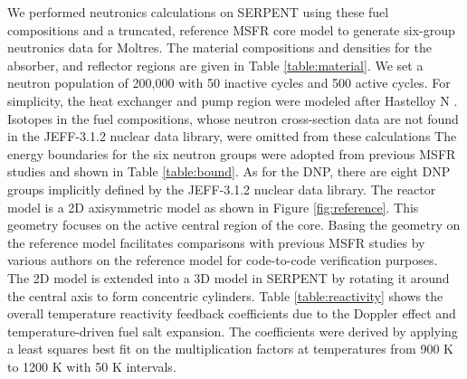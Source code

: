 \documentclass{anstrans}
\begin{document}
	We performed neutronics calculations on SERPENT using these fuel
	compositions and a truncated, reference \gls{MSFR} core model
	\cite{pettersen_coupled_2016} to generate six-group neutronics data for
	Moltres. The material compositions and densities for the absorber,
	and reflector regions are given in Table \ref{table:material}. We set a
	neutron population of 200,000 with 50 inactive cycles and 500 active
	cycles. For
	simplicity, the heat exchanger and pump region were modeled after
	Hastelloy N \cite{hastelloy_2017}. Isotopes in the fuel compositions, whose
	neutron cross-section data are not found in the
	JEFF-3.1.2 nuclear data library, were omitted from these calculations
	The energy boundaries for the six neutron groups were adopted from previous
	\gls{MSFR} studies and shown in Table \ref{table:bound}.
	As for the \gls{DNP}, there are eight \gls{DNP} groups implicitly defined
	by the JEFF-3.1.2 nuclear data library.
	The reactor model is a 2D axisymmetric model as shown in
	Figure \ref{fig:reference}. This geometry focuses on the active central
	region of the core. Basing the geometry on the reference model facilitates
	comparisons with previous MSFR studies by various authors
	\cite{fiorina_modelling_2014} \cite{pettersen_coupled_2016} on the
	reference model for code-to-code verification purposes.
	The 2D model is extended into a 3D model in SERPENT by rotating it
	around the central axis to form concentric cylinders. Table
	\ref{table:reactivity} shows the overall temperature reactivity feedback
	coefficients due to the Doppler effect and
	temperature-driven fuel salt expansion. The coefficients were derived by
	applying a least squares best fit on the multiplication factors at
	temperatures from 900 K to 1200 K with 50 K intervals.
	
\end{document}
